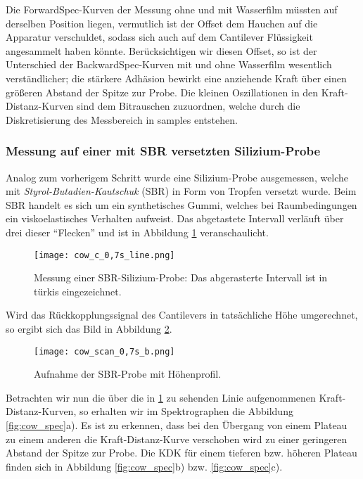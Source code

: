 Die ForwardSpec-Kurven der Messung ohne und mit Wasserfilm müssten auf derselben Position liegen, vermutlich ist der Offset dem Hauchen auf die Apparatur verschuldet, sodass sich auch auf dem Cantilever Flüssigkeit angesammelt haben könnte.
Berücksichtigen wir diesen Offset, so ist der Unterschied der BackwardSpec-Kurven mit und ohne Wasserfilm wesentlich verständlicher; die stärkere Adhäsion bewirkt eine anziehende Kraft über einen größeren Abstand der Spitze zur Probe.
Die kleinen Oszillationen in den Kraft-Distanz-Kurven sind dem Bitrauschen zuzuordnen, welche durch die Diskretisierung des Messbereich in samples entstehen.

\newpage
\subsubsection{Messung auf einer mit SBR versetzten Silizium-Probe}
Analog zum vorherigem Schritt wurde eine Silizium-Probe ausgemessen, welche mit \emph{Styrol-Butadien-Kautschuk} (SBR) in Form von Tropfen versetzt wurde. Beim SBR handelt es sich um ein synthetisches Gummi, welches bei Raumbedingungen ein viskoelastisches Verhalten aufweist.
Das abgetastete Intervall verläuft über drei dieser ``Flecken'' und ist in Abbildung \ref{fig:cow_line} veranschaulicht.
\begin{figure}[h]
	\centering
	\texttt{[image: cow\_c\_0,7s\_line.png]}
	\caption[Messung einer SBR-Silizium-Probe]{Messung einer SBR-Silizium-Probe: Das abgerasterte Intervall ist in türkis eingezeichnet.}
	\label{fig:cow_line}
\end{figure}
Wird das Rückkopplungssignal des Cantilevers in tatsächliche Höhe umgerechnet, so ergibt sich das Bild in Abbildung \ref{fig:cow_z}.
\begin{figure}[h]
	\centering
	\texttt{[image: cow\_scan\_0,7s\_b.png]}
	\caption{Aufnahme der SBR-Probe mit Höhenprofil.}
	\label{fig:cow_z}
\end{figure}
Betrachten wir nun die über die in \ref{fig:cow_line} zu sehenden Linie aufgenommenen Kraft-Distanz-Kurven, so erhalten wir im Spektrographen die Abbildung \ref{fig:cow_spec}a). Es ist zu erkennen, dass bei den Übergang von einem Plateau zu einem anderen die Kraft-Distanz-Kurve verschoben wird zu einer geringeren Abstand der Spitze zur Probe. Die KDK für einem tieferen bzw. höheren Plateau finden sich in Abbildung \ref{fig:cow_spec}b) bzw. \ref{fig:cow_spec}c).
